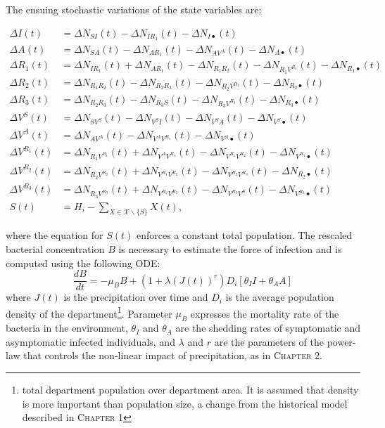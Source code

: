 The ensuing stochastic variations of the state variables are:
\begin{fullwidth}
\begingroup
\allowdisplaybreaks
\label{eq:stochstates}
\begin{align}
    \Delta I(t) &= \Delta N_{SI}(t) -  \Delta N_{IR_1}(t) -  \Delta N_{I\bullet}(t)\\
    \Delta A(t) &= \Delta N_{SA}(t) -  \Delta N_{AR_1}(t) -  \Delta N_{AV^A}(t) - \Delta N_{A\bullet}(t)\\
    \Delta R_1(t) &= \Delta N_{IR_1}(t) + \Delta N_{AR_1}(t) -  \Delta N_{R_1 R_2}(t) -  \Delta N_{R_1V^{R_1}}(t) -  \Delta N_{R_1\bullet}(t)\\
    \Delta R_2(t) &= \Delta N_{R_1R_2}(t) - \Delta N_{R_2 R_3}(t) -  \Delta N_{R_2V^{R_2}}(t) -  \Delta N_{R_2\bullet}(t)\\
    \Delta R_3(t) &= \Delta N_{R_2R_3}(t) - \Delta N_{R_3 S}(t) -  \Delta N_{R_3V^{R_3}}(t) -  \Delta N_{R_3\bullet}(t)\\
    \Delta V^S(t) &= \Delta N_{SV^S}(t) -  \Delta N_{V^S I}(t)-  \Delta N_{V^S A}(t) - \Delta N_{V^S\bullet}(t)\\
    \Delta V^A(t) &= \Delta N_{AV^A}(t) -  \Delta N_{V^AV^{R_1}}(t) - \Delta N_{V^A\bullet}(t)\\
    \Delta V^{R_1}(t) &= \Delta N_{R_1V^{R_1}}(t) +  \Delta N_{V^AV^{R_1}}(t) - \Delta N_{V^{R_1}V^{R_2}}(t) - \Delta N_{V^{R_1}\bullet}(t)\\
    \Delta V^{R_2}(t) &=\Delta N_{R_2V^{R_2}}(t)+\Delta N_{V^{R_1} V^{R_2}}(t) -  \Delta N_{V^{R_2}V^{R_3}}(t) -  \Delta N_{R_2\bullet}(t)\\
    \Delta V^{R_3}(t) &= \Delta N_{R_3V^{R_3}}(t)+\Delta N_{V^{R_2}V^{R_3}}(t) - \Delta N_{V^{R_3}V^ S}(t) - \Delta N_{V^{R_3}\bullet}(t)\\
    S(t) &= H_i - \sum_{X \in \mathcal{X} \backslash \{S\}} X(t),
\end{align}
\endgroup
\end{fullwidth}
where the equation for $S(t)$ enforces a constant total population. 
The rescaled bacterial concentration $B$ is necessary to estimate the force of infection and is computed using the following ODE:
\begin{equation}
\frac{dB}{dt} = - \mu_B B +  \left(1 + \lambda\left( J(t)\right)^{r} \right)  D_i \left[\theta_I I + \theta_A A\right] 
\end{equation}
where $J(t)$ is the precipitation over time and $D_i$ is the average population density of the department\footnote{total department population over department area. It is assumed that density is more important than population size, a change from the historical model described in \textsc{Chapter 1}}.  Parameter $\mu_B$ expresses the mortality rate of the bacteria in the environment, $\theta_I$ and $\theta_A$ are the shedding rates of symptomatic and asymptomatic infected individuals, and $\lambda$ and $r$ are the parameters of the power-law that controls the non-linear impact of precipitation, as in \textsc{Chapter 2}.


